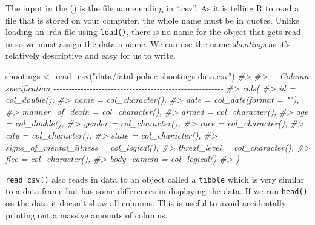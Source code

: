 \documentclass[
  12pt,
]{book}
\newenvironment{Shaded}{\begin{snugshade}}{\end{snugshade}}
\newcommand{\CommentTok}[1]{\textcolor[rgb]{0.37,0.37,0.37}{\textit{#1}}}
\newcommand{\FunctionTok}[1]{\textcolor[rgb]{0,0,0}{#1}}
\newcommand{\NormalTok}[1]{#1}
\newcommand{\OtherTok}[1]{\textcolor[rgb]{0.37,0.37,0.37}{#1}}
\newcommand{\StringTok}[1]{\textcolor[rgb]{0.5,0.5,0.5}{#1}}
\begin{document}
The input in the () is the file name ending in ``.csv''. As it is telling R to read a file that is stored on your computer, the whole name must be in quotes. Unlike loading an .rda file using \texttt{load()}, there is no name for the object that gets read in so we must assign the data a name. We can use the name \emph{shootings} as it's relatively descriptive and easy for us to write.

\begin{Shaded}
\begin{Highlighting}[]
\NormalTok{shootings }\OtherTok{\textless{}{-}} \FunctionTok{read\_csv}\NormalTok{(}\StringTok{"data/fatal{-}police{-}shootings{-}data.csv"}\NormalTok{)}
\CommentTok{\#\textgreater{} }
\CommentTok{\#\textgreater{} {-}{-} Column specification {-}{-}{-}{-}{-}{-}{-}{-}{-}{-}{-}{-}{-}{-}{-}{-}{-}{-}{-}{-}{-}{-}{-}{-}{-}{-}{-}{-}{-}{-}{-}{-}{-}{-}{-}{-}{-}{-}{-}{-}{-}{-}{-}{-}{-}{-}{-}{-}{-}{-}{-}{-}{-}{-}{-}{-}}
\CommentTok{\#\textgreater{} cols(}
\CommentTok{\#\textgreater{}   id = col\_double(),}
\CommentTok{\#\textgreater{}   name = col\_character(),}
\CommentTok{\#\textgreater{}   date = col\_date(format = ""),}
\CommentTok{\#\textgreater{}   manner\_of\_death = col\_character(),}
\CommentTok{\#\textgreater{}   armed = col\_character(),}
\CommentTok{\#\textgreater{}   age = col\_double(),}
\CommentTok{\#\textgreater{}   gender = col\_character(),}
\CommentTok{\#\textgreater{}   race = col\_character(),}
\CommentTok{\#\textgreater{}   city = col\_character(),}
\CommentTok{\#\textgreater{}   state = col\_character(),}
\CommentTok{\#\textgreater{}   signs\_of\_mental\_illness = col\_logical(),}
\CommentTok{\#\textgreater{}   threat\_level = col\_character(),}
\CommentTok{\#\textgreater{}   flee = col\_character(),}
\CommentTok{\#\textgreater{}   body\_camera = col\_logical()}
\CommentTok{\#\textgreater{} )}
\end{Highlighting}
\end{Shaded}

\texttt{read\_csv()} also reads in data to an object called a \texttt{tibble} which is very similar to a data.frame but has some differences in displaying the data. If we run \texttt{head()} on the data it doesn't show all columns. This is useful to avoid accidentally printing out a massive amounts of columns.
\end{document}
